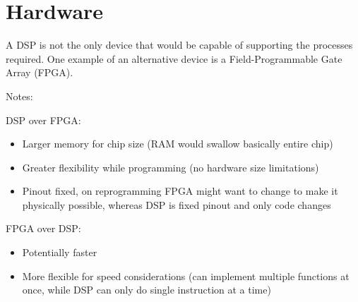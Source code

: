 \section{Hardware}
A DSP is not the only device that would be capable of supporting the processes required. One example of an alternative device is a Field-Programmable Gate Array (FPGA).

Notes:

DSP over FPGA:
\begin{itemize}
\item Larger memory for chip size (RAM would swallow basically entire chip)
\item Greater flexibility while programming (no hardware size limitations)
\item Pinout fixed, on reprogramming FPGA might want to change to make it physically possible, whereas DSP is fixed pinout and only code changes
\end{itemize}

FPGA over DSP:
\begin{itemize}
\item Potentially faster
\item More flexible for speed considerations (can implement multiple functions at once, while DSP can only do single instruction at a time)
\end{itemize}
